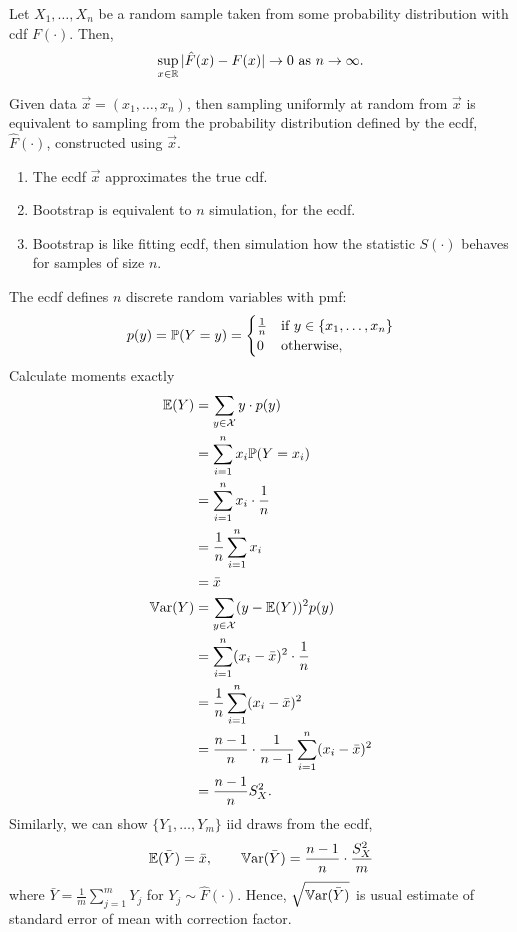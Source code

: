 \documentclass[10pt, a4paper]{article}
\begin{document}
\begin{theorem}
    Let $X_1, \dotsc, X_n$ be a random sample taken from some probability distribution with cdf $F(\cdot)$.
    Then,
    \[
    \sup_{x \in \R}|\hat{F}(x) - F(x)| \to 0\text{ as } n \to \infty.
    \]
\end{theorem}

\begin{lemma}
    Given data $\vec{x} = (x_1, \dotsc, x_n)$,
    then sampling uniformly at random from $\vec{x}$ is equivalent to sampling from the probability distribution defined by the ecdf,
    $\hat{F}(\cdot)$,
    constructed using $\vec{x}$.
\end{lemma}

\begin{enumerate}[label = (\alph*)]
    \item The ecdf $\vec{x}$ approximates the true cdf.

    \item Bootstrap is equivalent to $n$ simulation,
    for the ecdf.

    \item Bootstrap is like fitting ecdf,
    then simulation how the statistic $S(\cdot)$ behaves for samples of size $n$.
\end{enumerate}

The ecdf defines $n$ discrete random variables with pmf:
\[
p(y) = \P(Y = y) = \begin{cases}
    \frac{1}{n} &\text{if } y \in \{x_1, \dotsc, x_n\} \\
    0 &\text{otherwise},
\end{cases}
\]
Calculate moments exactly
\begin{align*}
    \E(Y) &= \sum_{y \in \mathcal{X}}y\cdot p(y) \\
    &= \sum_{i = 1}^{n}x_i\P(Y = x_i) \\
    &= \sum_{i = 1}^{n}x_i\cdot\frac{1}{n} \\
    &= \frac{1}{n}\sum_{i = 1}^{n}x_i \\
    &= \bar{x} \\
    \Var(Y) &= \sum_{y \in \mathcal{X}}(y - \E(Y)) ^ 2p(y) \\
    &= \sum_{i = 1}^{n}(x_i - \bar{x}) ^ 2\cdot\frac{1}{n} \\
    &= \frac{1}{n}\sum_{i = 1}^{n}(x_i - \bar{x}) ^ 2 \\
    &= \frac{n - 1}{n}\cdot\frac{1}{n - 1}\sum_{i = 1}^{n}(x_i - \bar{x}) ^ 2 \\
    &= \frac{n - 1}{n}S_{X} ^ 2.
\end{align*}
Similarly,
we can show $\{Y_1, \dotsc, Y_m\}$ iid draws from the ecdf,
\[
\E(\bar{Y}) = \bar{x},\qquad \Var(\bar{Y}) = \frac{n - 1}{n}\cdot \frac{S_{X} ^ 2}{m}
\]
where $\bar{Y} = \frac{1}{m}\sum_{j = 1}^{m}Y_j$ for $Y_j \sim \hat{F}(\cdot)$.
Hence,
$\sqrt{\Var(\bar{Y})}$ is usual estimate of standard error of mean with correction factor.
\end{document}
